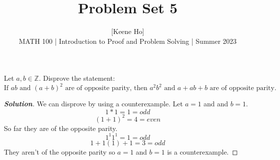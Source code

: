 \documentclass[11pt]{article}
\newenvironment{problem}[2][Problem\!]{\begin{trivlist}
\item[\hskip \labelsep {\bfseries #1}\hskip \labelsep {\bfseries #2.}]}{\end{trivlist}}
\newenvironment{solution}{\begin{proof}[\textbf{\textit{Solution}}]}{\end{proof}}
\newcommand{\zz}{\mathbb Z}   %
\begin{document}
 
\title{Problem Set 5}
\author{[Keene Ho]\\[0.5em]
MATH 100 | Introduction to Proof and Problem Solving | Summer 2023}
\date{} 
\maketitle


\begin{problem}{5.1}
Let $a, b \in \zz$. Disprove the statement: \[\text{If $ab$ and $(a + b)^2$ are of opposite parity, then $a^2b^2$ and $a + ab + b$ are of opposite parity.}\]
\end{problem}
\begin{solution}\hfill %
We can disprove by using a counterexample. Let \(a = 1\) and and \(b = 1\).
\[1*1 = 1 = odd\]
\[(1+1)^2 = 4 = even\]
So far they are of the opposite parity.
\[1^{1}1^{1} = 1 = odd\]
\[1+1(1)+1 = 3 = odd\]
They aren't of the opposite parity so \(a = 1\) and \(b = 1\) is a counterexample.
\end{solution}

\newpage %
\end{document}
